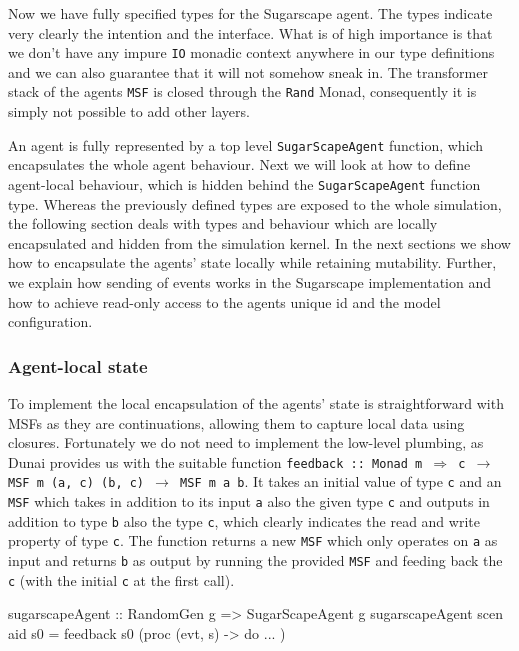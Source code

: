 Now we have fully specified types for the Sugarscape agent. The types indicate very clearly the intention and the interface. What is of high importance is that we don't have any impure \texttt{IO} monadic context anywhere in our type definitions and we can also guarantee that it will not somehow sneak in. The transformer stack of the agents \texttt{MSF} is closed through the \texttt{Rand} Monad, consequently it is simply not possible to add other layers. 

An agent is fully represented by a top level \texttt{SugarScapeAgent} function, which encapsulates the whole agent behaviour. Next we will look at how to define agent-local behaviour, which is hidden behind the \texttt{SugarScapeAgent} function type. Whereas the previously defined types are exposed to the whole simulation, the following section deals with types and behaviour which are locally encapsulated and hidden from the simulation kernel. In the next sections we show how to encapsulate the agents' state locally while retaining mutability. Further, we explain how sending of events works in the Sugarscape implementation and how to achieve read-only access to the agents unique id and the model configuration.

\subsubsection{Agent-local state}
To implement the local encapsulation of the agents' state is straightforward with MSFs as they are continuations, allowing them to capture local data using closures. Fortunately we do not need to implement the low-level plumbing, as Dunai provides us with the suitable function \texttt{feedback :: Monad m $\Rightarrow$ c $\rightarrow$ MSF m (a, c) (b, c) $\rightarrow$ MSF m a b}. It takes an initial value of type \texttt{c} and an \texttt{MSF} which takes in addition to its input \texttt{a} also the given type \texttt{c} and outputs in addition to type \texttt{b} also the type \texttt{c}, which clearly indicates the read and write property of type \texttt{c}. The function returns a new \texttt{MSF} which only operates on \texttt{a} as input and returns \texttt{b} as output by running the provided \texttt{MSF} and feeding back the \texttt{c} (with the initial \texttt{c} at the first call).

\begin{HaskellCode}
sugarscapeAgent :: RandomGen g => SugarScapeAgent g
sugarscapeAgent scen aid s0 = feedback s0 (proc (evt, s) -> do ... )
\end{HaskellCode}

